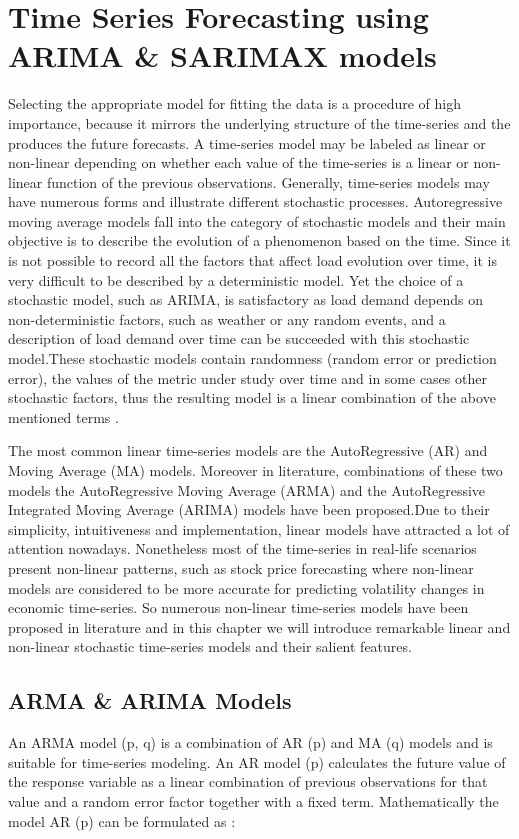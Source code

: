 \chapter{Time Series Forecasting using ARIMA \& SARIMAX models}
Selecting the appropriate model for fitting the data is a procedure of high importance, because it mirrors the underlying structure of the time-series and  the produces the future forecasts. A time-series model may be labeled as linear or non-linear depending on whether each value of the time-series is a linear or non-linear function of the previous observations. Generally, time-series models may have numerous forms and illustrate different stochastic processes. Autoregressive moving average models fall into the category of stochastic models and their main objective is to describe the evolution of a phenomenon based on the time. Since it is not possible to record all the factors that affect load evolution over time, it is very difficult to be described by a deterministic model. Yet the choice of a stochastic model, such as ARIMA, is satisfactory as load demand depends on non-deterministic factors, such as weather or any random events, and a description of load demand over time can be succeeded with this stochastic model.These stochastic models contain randomness (random error or prediction error), the values of the metric under study over time and in some cases other stochastic factors, thus the resulting model is a linear combination of the above mentioned terms \cite{kihoro2004seasonal}.
\par 
The most common linear time-series models are the AutoRegressive (AR) and Moving Average (MA) models. Moreover in literature, combinations of these two models the AutoRegressive Moving Average (ARMA) and the AutoRegressive Integrated Moving Average (ARIMA) models have been proposed.Due to their simplicity, intuitiveness and implementation, linear models have attracted a lot of attention nowadays. Nonetheless most of the time-series in real-life scenarios present non-linear patterns, such as stock price forecasting where non-linear models are considered to be more accurate for predicting volatility changes in economic time-series. So numerous non-linear time-series models have been proposed in literature and in this chapter we will introduce remarkable linear and non-linear stochastic time-series models and their salient features.
\section{ARMA \& ARIMA Models}
\par An ARMA model (p, q) is a combination of AR (p) and MA (q) models and is suitable for time-series modeling. An AR model (p) calculates the future value of the response variable as a linear combination of previous observations for that value and a random error factor together with a fixed term. Mathematically the model AR (p) can be formulated as \cite{contreras2003arima}:

